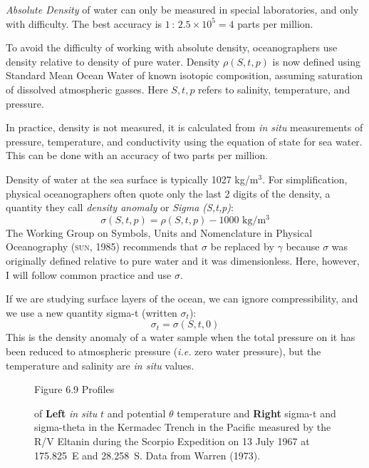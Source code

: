 \textit{Absolute Density} of water can only be
measured in special laboratories, and only with difficulty. The best accuracy is
$1\,:\, 2.5 \times 10^5 = 4$ parts per million.

To avoid the difficulty of working with absolute density, oceanographers use
density relative to density of pure water. Density $\rho (S, t, p)$ is now
defined using Standard Mean Ocean Water of known isotopic composition, assuming
saturation of dissolved atmospheric gasses. Here $S, t, p$ refers to salinity,
temperature, and pressure.

In practice, density is not measured, it is calculated from \textit{in situ} 
measurements of pressure, temperature, and conductivity using the equation of
state for sea water. This can be done with an accuracy of two parts per
million.

Density of water at the sea surface is typically 1027 kg/m$^3$. For
simplification, physical oceanographers often quote only the last 2 digits of the
density, a quantity they call \textit{density anomaly} or \textit{Sigma
(S,t,p)}:
\begin{equation}
\sigma(S,t,p) = \rho (S, t, p) - 1000 \text{\ kg/m$^3$}
\end{equation}
The Working Group on Symbols, Units and Nomenclature in Physical Oceanography (\textsc{sun}, 1985) recommends that $\sigma$ be replaced by $\gamma$ because $\sigma$ was originally defined relative to pure water and it was dimensionless. Here, however, I will follow common practice and use $\sigma$.

If we are studying surface layers of the ocean, we can ignore compressibility, and
we use a new quantity sigma-t (written $\sigma _t$):
\begin{equation}
\sigma _t =  \sigma(S,t,0)
\end{equation}
This is the density anomaly of a water sample when the total pressure on it
has been reduced to atmospheric pressure (\textit{i.e.} zero water pressure), but
the temperature and salinity are \textit{in situ} values.

\begin{figure}[t!]
\footnotesize
Figure 6.9 Profiles \rule{0mm}{4ex}of \textbf{Left} \textit{in situ} $t$ and potential $\theta$
temperature and \textbf{Right} sigma-t and sigma-theta in the Kermadec Trench in the
Pacific measured by the R/V Eltanin during the Scorpio Expedition on 13 July 1967
at 175.825\degrees\ E and 28.258\degrees\ S. Data from Warren (1973).

\label{fig:thetaprofile}
\vspace{-4ex}
\end{figure}

